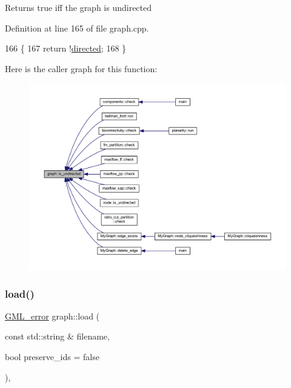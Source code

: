 \begin{DoxyReturn}{Returns}
true iff the graph is undirected 
\end{DoxyReturn}


Definition at line 165 of file graph.\+cpp.


\begin{DoxyCode}
166 \{
167     \textcolor{keywordflow}{return} !\mbox{\hyperlink{classgraph_ab4120df210eb3d03d20b0bd27f8cbe8c}{directed}};
168 \}
\end{DoxyCode}
Here is the caller graph for this function\+:
\nopagebreak
\begin{figure}[H]
\begin{center}
\leavevmode
\includegraphics[width=350pt]{classgraph_aba427ff8ba0f70c68416ec1351344cd8_icgraph}
\end{center}
\end{figure}
\mbox{\label{classgraph_ac28cb3468623a480709d3329033d4ec8}} 
\subsubsection{\texorpdfstring{load()}{load()}\hspace{0.1cm}{\footnotesize\ttfamily [1/2]}}
{\footnotesize\ttfamily \mbox{\hyperlink{struct_g_m_l__error}{G\+M\+L\+\_\+error}} graph\+::load (\begin{DoxyParamCaption}\item[{const std\+::string \&}]{filename,  }\item[{bool}]{preserve\+\_\+ids = {\ttfamily false} }\end{DoxyParamCaption})\hspace{0.3cm}{\ttfamily [inline]}, {\ttfamily [inherited]}}

